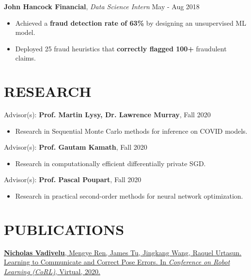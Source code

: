 \documentclass[line,margin]{res}
\newcommand{\experience}[3]{\textbf{#1}, \textit{#2} \hfill #3 \\ \vspace{-4mm}}
\newcommand{\ura}[3]{Advisor(s): \textbf{#1}, \textit{#2} \hfill #3 \\ \vspace{-4mm}}
\newcommand{\paper}[6]{\href{#6}{#1. #2. In \textit{#3}, #4, #5.}}
\begin{document}
\begin{resume}
    \experience{John Hancock Financial}{Data Science Intern}{May - Aug 2018}
    \begin{itemize}
        \item Achieved a \textbf{fraud detection rate of 63\%} by designing an unsupervised ML model.
        \item Deployed 25 fraud heuristics that \textbf{correctly flagged 100+} fraudulent claims.
    \end{itemize}



\section{RESEARCH}
    \ura{Prof. Martin Lysy, Dr. Lawrence Murray}{}{Fall 2020}
    \begin{itemize}
        \item Research in Sequential Monte Carlo methods for inference on COVID models.
    \end{itemize}
    \vspace{-2mm}

    \ura{Prof. Gautam Kamath}{}{Fall 2020}
    \begin{itemize}
        \item Research in computationally efficient differentially private SGD.
    \end{itemize}
    \vspace{-2mm}

    \ura{Prof. Pascal Poupart}{}{Fall 2020}
    \begin{itemize}
        \item Research in practical second-order methods for neural network optimization.
    \end{itemize}
    \vspace{-2mm}

\section{PUBLICATIONS}
    \paper
    {\textbf{Nicholas Vadivelu}, Mengye Ren, James Tu, Jingkang Wang, Raquel Urtasun}
    {Learning to Communicate and Correct Pose Errors}
    {Conference on Robot Learning (CoRL)}{Virtual}{2020}
    {https://arxiv.org/abs/2011.05289}
    \vspace{-3mm}


\end{resume}
\end{document}

